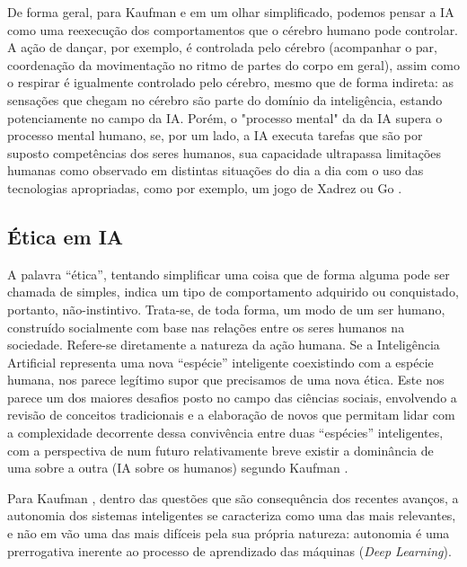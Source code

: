 De forma geral, para Kaufman \cite{kaufman} e em um olhar simplificado, podemos pensar a \acrshort{IA} como uma reexecução dos comportamentos que o cérebro humano pode controlar. A ação de dançar, por exemplo, é controlada pelo cérebro (acompanhar o par, coordenação da movimentação no ritmo de partes do corpo em geral), assim como o respirar é igualmente controlado pelo cérebro, mesmo que de forma indireta: as sensações que chegam no cérebro são parte do domínio da inteligência, estando potenciamente no campo da \acrshort{IA}. Porém, o "processo mental" da da \acrshort{IA} supera o processo mental humano, se, por um lado, a \acrshort{IA} executa tarefas que são por suposto competências dos seres humanos, sua capacidade ultrapassa limitações humanas como observado em distintas situações do dia a dia com o uso das tecnologias apropriadas, como por exemplo, um jogo de Xadrez\cite{xadrez} ou Go \cite{gojogo}. 

\subsection{Ética em IA}

 A palavra “ética”, tentando simplificar uma coisa que de forma alguma pode ser chamada de simples, indica um tipo de comportamento adquirido ou conquistado, portanto, não-instintivo. Trata-se, de toda forma, um modo de um ser humano, construído socialmente com base nas relações entre os seres humanos na sociedade. Refere-se diretamente a natureza da ação humana. Se a Inteligência Artificial representa uma nova “espécie” inteligente coexistindo com a espécie humana, nos parece legítimo supor que precisamos de uma nova ética. Este nos parece um dos maiores desafios posto no campo das ciências sociais, envolvendo a revisão de conceitos tradicionais e a elaboração de novos que permitam lidar com a complexidade decorrente dessa convivência entre duas “espécies” inteligentes, com a perspectiva de num futuro relativamente breve existir a dominância de uma sobre a outra (IA sobre os humanos) segundo Kaufman \cite{kaufman}.

  Para Kaufman \cite{kaufman}, dentro das questões que são consequência dos recentes avanços, a autonomia dos sistemas inteligentes se caracteriza como uma das mais relevantes, e não em vão uma das mais difíceis pela sua própria natureza: autonomia é uma prerrogativa inerente ao processo de aprendizado das máquinas (\textit{Deep Learning}). 

